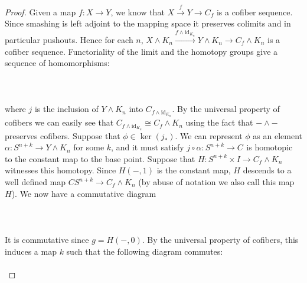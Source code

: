 \documentclass[a4paper]{article}
\begin{document}
\begin{thm}{}{}
\begin{proof}
Given a map $f:X\to Y$, we know that $X\overset{f}{\rightarrow}Y\rightarrow C_f$ is a cofiber sequence. Since smashing is left adjoint to the mapping space it preserves colimits and in particular pushouts. Hence for each $n$, $X\wedge K_n\overset{f\wedge\text{id}_{K_n}}{\rightarrow}Y\wedge K_n\rightarrow C_f\wedge K_n$ is a cofiber sequence. Functoriality of the limit and the homotopy groups give a sequence of homomorphisms: 	\\~\\
\\~\\
where $j$ is the inclusion of $Y\wedge K_n$ into $C_{f\wedge\text{id}_{K_n}}$. By the universal property of cofibers we can easily see that $C_{f\wedge\text{id}_{K_n}}\cong C_f\wedge K_n$ using the fact that $-\wedge-$ preserves cofibers. Suppose that $\phi\in\ker(j_\ast)$. We can represent $\phi$ as an element $\alpha:S^{n+k}\to Y\wedge K_n$ for some $k$, and it must satisfy $j\circ\alpha:S^{n+k}\to C_{}$ is homotopic to the constant map to the base point. Suppose that $H:S^{n+k}\times I\to C_f\wedge K_n$ witnesses this homotopy. Since $H(-,1)$ is the constant map, $H$ descends to a well defined map $CS^{n+k}\to C_f\wedge K_n$ (by abuse of notation we also call this map $H$). We now have a commutative diagram \\~\\
\\~\\
It is commutative since $g=H(-,0)$. By the universal property of cofibers, this induces a map $k$ such that the following diagram commutes: \\~\\
\end{proof}
\end{thm}
\end{document}
